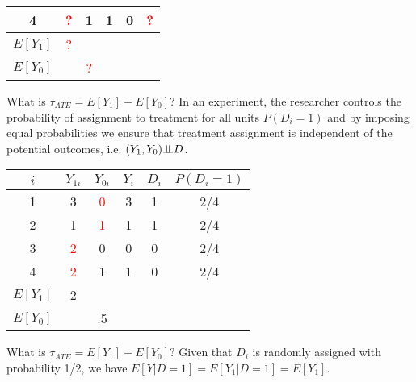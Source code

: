\documentclass{beamer}
\numberwithin{equation}{section}
\newcommand{\indep}{{\bot\negthickspace\negthickspace\bot}}
\begin{document}
\begin{frame}
\begin{overprint}
\begin{center}
\begin{tabular}{cccccc}
\rowcolor{gray!30}         4 &          \textcolor{red}{?} &         1 &          1 &          0  & \textcolor{red}{?} \\
\hline
$E[Y_1]$& \textcolor{red}{?} & & &  &  \\
$E[Y_0]$&  & \textcolor{red}{?} &  &  &  \\
\hline
\end{tabular}
\end{center}
\bigskip
What is $\tau_{ATE}=E[Y_1] -E[Y_0]$? In an experiment, the researcher controls the probability of assignment to treatment for all units $P(D_i=1)$ and by imposing equal probabilities we ensure that treatment assignment is independent of the potential outcomes, i.e. $(Y_1,Y_0) \indep D$. 
\begin{center}
\begin{tabular}{cccccc}
 \multicolumn{1}{p{2cm}}{\center $i$} &   \multicolumn{1}{p{1cm}}{\center $Y_{1i}$} & \multicolumn{1}{p{1cm}}{\center $Y_{0i}$}&    \multicolumn{1}{p{1cm}}{\center $Y_{i}$} &   \multicolumn{1}{p{1cm}}{\center $D_{i}$}   &   \multicolumn{1}{p{2cm}}{\center $P(D_{i}=1)$}   \\
\hline
\rowcolor{gray!10}        1 &          3 &        \textcolor{red}{0} &          3 &          1 & 2/4  \\
\rowcolor{gray!10}         2 &         1 &       \textcolor{red}{1} &          1 &          1  & 2/4 \\
\rowcolor{gray!30}         3 &          \textcolor{red}{2} &         0 &          0 &          0  & 2/4 \\
\rowcolor{gray!30}         4 &          \textcolor{red}{2} &         1 &          1 &          0 & 2/4  \\
\hline
$E[Y_1]$& 2 & & &    \\
$E[Y_0]$&  & .5 &  &    \\
\hline
\end{tabular}
\end{center}
What is $\tau_{ATE}=E[Y_1] -E[Y_0]$? Given that $D_i$ is randomly assigned with probability 1/2, we have $E[Y|D=1]=E[Y_1|D=1]=E[Y_1]$.\\


\end{overprint}
\end{frame}
\end{document}

